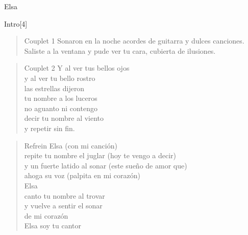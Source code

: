 \begin{song}[tango]{Elsa}
\begin{instrumental}{Intro}[4]
 \measure{}  \measure{}
 \measure{}  \measure{}
 \measure{}  \measure{}
 \measure{} 
\end{instrumental}

\begin{verse}{Couplet 1}
Sonaron en la noche 
acordes de guitarra 
y dulces canciones.\\
Saliste a la ventana 
y pude ver tu cara, 
cubierta de ilusiones.
\end{verse}

\begin{verse}{Couplet 2}
Y al ver tus bellos ojos\\
y al ver tu bello rostro\\
las estrellas dijeron \\
tu nombre a los luceros\\
no aguanto ni contengo\\
decir tu nombre al viento\\
y repetir sin fin.
\end{verse}


\begin{verse}{Refrein}
Elsa   (con mi canción)\\
repite tu nombre el juglar  (hoy te vengo a decir)\\
y un fuerte latido al sonar  (este sueño de amor que)\\
ahoga su voz   (palpita en mi corazón)\\
  
Elsa\\
canto tu nombre al trovar\\
y vuelve a sentir el sonar\\
de mi corazón\\

Elsa soy tu cantor
\end{verse}


\begin{translation}

\end{translation}
\end{song}

